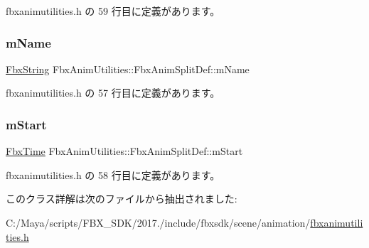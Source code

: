  fbxanimutilities.\+h の 59 行目に定義があります。

\mbox{\label{class_fbx_anim_utilities_1_1_fbx_anim_split_def_ae78929097a3526acf01e3d0f7f89796f}} 
\subsubsection{\texorpdfstring{m\+Name}{mName}}
{\footnotesize\ttfamily \hyperlink{class_fbx_string}{Fbx\+String} Fbx\+Anim\+Utilities\+::\+Fbx\+Anim\+Split\+Def\+::m\+Name}



 fbxanimutilities.\+h の 57 行目に定義があります。

\mbox{\label{class_fbx_anim_utilities_1_1_fbx_anim_split_def_af8aad5671b9f1bef7a5af4a226a0f646}} 
\subsubsection{\texorpdfstring{m\+Start}{mStart}}
{\footnotesize\ttfamily \hyperlink{class_fbx_time}{Fbx\+Time} Fbx\+Anim\+Utilities\+::\+Fbx\+Anim\+Split\+Def\+::m\+Start}



 fbxanimutilities.\+h の 58 行目に定義があります。



このクラス詳解は次のファイルから抽出されました\+:\begin{DoxyCompactItemize}
\item 
C\+:/\+Maya/scripts/\+F\+B\+X\+\_\+\+S\+D\+K/2017./include/fbxsdk/scene/animation/\hyperlink{fbxanimutilities_8h}{fbxanimutilities.\+h}\end{DoxyCompactItemize}
